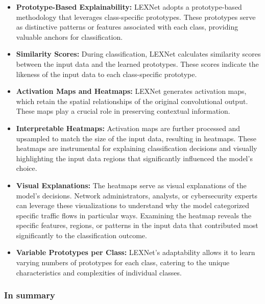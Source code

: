 \documentclass{article}
\begin{document}
\begin{itemize}

    \item \textbf{Prototype-Based Explainability:} LEXNet adopts a prototype-based methodology that leverages class-specific prototypes. These prototypes serve as distinctive patterns or features associated with each class, providing valuable anchors for classification.

    \item \textbf{Similarity Scores:} During classification, LEXNet calculates similarity scores between the input data and the learned prototypes. These scores indicate the likeness of the input data to each class-specific prototype.

    \item \textbf{Activation Maps and Heatmaps:} LEXNet generates activation maps, which retain the spatial relationships of the original convolutional output. These maps play a crucial role in preserving contextual information.

    \item \textbf{Interpretable Heatmaps:} Activation maps are further processed and upsampled to match the size of the input data, resulting in heatmaps. These heatmaps are instrumental for explaining classification decisions and visually highlighting the input data regions that significantly influenced the model's choice.

    \item \textbf{Visual Explanations:} The heatmaps serve as visual explanations of the model's decisions. Network administrators, analysts, or cybersecurity experts can leverage these visualizations to understand why the model categorized specific traffic flows in particular ways. Examining the heatmap reveals the specific features, regions, or patterns in the input data that contributed most significantly to the classification outcome.

    \item \textbf{Variable Prototypes per Class:} LEXNet's adaptability allows it to learn varying numbers of prototypes for each class, catering to the unique characteristics and complexities of individual classes.

\end{itemize}

\subsubsection{In summary} 
\end{document}
